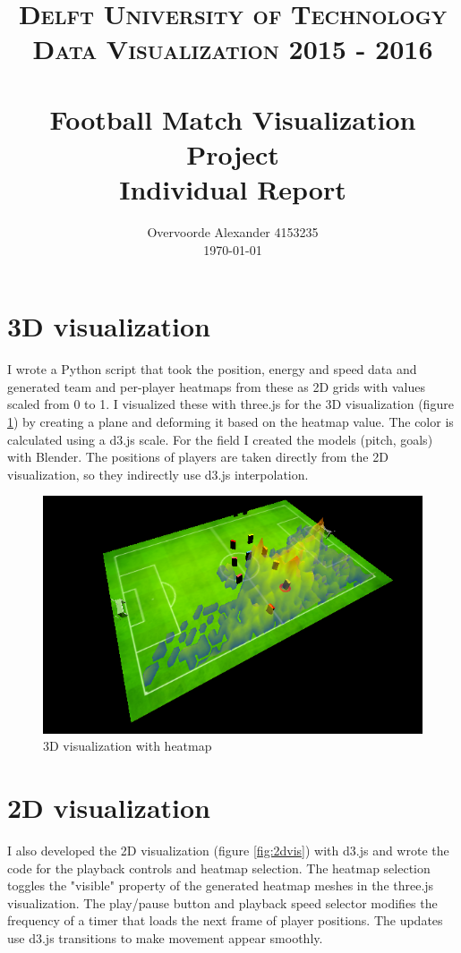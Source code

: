 \documentclass{article}
\title{ 	
		\usefont{OT1}{bch}{b}{n}
		\normalfont \normalsize \textsc{Delft University of Technology \protect\\ Data Visualization 2015 - 2016} \\ [25pt]
		\horrule{0.5pt} \\[0.4cm]
		\huge Football Match Visualization Project \\
		Individual Report
		\horrule{2pt} \\[0.5cm]
}
\author{
		\normalfont 								\normalsize
        Overvoorde Alexander 4153235\\[-3pt]		\normalsize
        \today
}
\date{}
\begin{document}
\lstset{language=Prolog}
\maketitle

\newpage

\section{3D visualization}

I wrote a Python script that took the position, energy and speed data and generated team and per-player heatmaps from these as 2D grids with values scaled from 0 to 1. I visualized these with three.js for the 3D visualization (figure \ref{fig:3dvis}) by creating a plane and deforming it based on the heatmap value. The color is calculated using a d3.js scale. For the field I created the models (pitch, goals) with Blender. The positions of players are taken directly from the 2D visualization, so they indirectly use d3.js interpolation.

\begin{figure}[ht!]
    \centering
    \includegraphics[scale=0.55]{3dvis.png}
    \caption{3D visualization with heatmap}
    \label{fig:3dvis}
\end{figure}

\section{2D visualization}

I also developed the 2D visualization (figure \ref{fig:2dvis}) with d3.js and wrote the code for the playback controls and heatmap selection. The heatmap selection toggles the "visible" property of the generated heatmap meshes in the three.js visualization. The play/pause button and playback speed selector modifies the frequency of a timer that loads the next frame of player positions. The updates use d3.js transitions to make movement appear smoothly.
\end{document}
